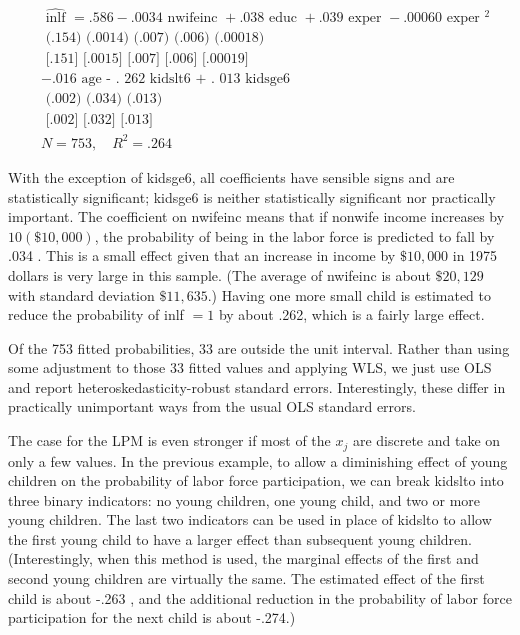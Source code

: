 \documentclass[10pt]{article}
\begin{document}
$$
\begin{aligned}
& \widehat{\text { inlf }}=.586-.0034 \text { nwifeinc }+.038 \text { educ }+.039 \text { exper }-.00060 \text { exper }^{2} \\
& \text { (.154) (.0014) (.007) (.006) (.00018) } \\
& \text { [.151] [.0015] [.007] [.006] [.00019] } \\
& -.016 \text { age - . } 262 \text { kidslt6 + . } 013 \text { kidsge6 } \\
& \text { (.002) (.034) (.013) } \\
& \text { [.002] [.032] [.013] } \\
& N=753, \quad R^{2}=.264
\end{aligned}
$$

With the exception of kidsge6, all coefficients have sensible signs and are statistically significant; kidsge6 is neither statistically significant nor practically important. The coefficient on nwifeinc means that if nonwife income increases by $10(\$ 10,000)$, the probability of being in the labor force is predicted to fall by .034 . This is a small effect given that an increase in income by $\$ 10,000$ in 1975 dollars is very large in this sample. (The average of nwifeinc is about $\$ 20,129$ with standard deviation $\$ 11,635$.) Having one more small child is estimated to reduce the probability of inlf $=1$ by about .262, which is a fairly large effect.

Of the 753 fitted probabilities, 33 are outside the unit interval. Rather than using some adjustment to those 33 fitted values and applying WLS, we just use OLS and report heteroskedasticity-robust standard errors. Interestingly, these differ in practically unimportant ways from the usual OLS standard errors.

The case for the LPM is even stronger if most of the $x_{j}$ are discrete and take on only a few values. In the previous example, to allow a diminishing effect of young children on the probability of labor force participation, we can break kidslto into three binary indicators: no young children, one young child, and two or more young children. The last two indicators can be used in place of kidslto to allow the first young child to have a larger effect than subsequent young children. (Interestingly, when this method is used, the marginal effects of the first and second young children are virtually the same. The estimated effect of the first child is about -.263 , and the additional reduction in the probability of labor force participation for the next child is about -.274.)
\end{document}

